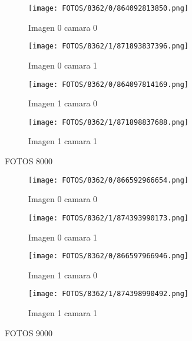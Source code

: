 \documentclass{article}
\begin{document}
\begin{figure}[H]
  \centering
  \begin{minipage}[b]{0.45\textwidth}
    \centering
    \texttt{[image: FOTOS/8362/0/864092813850.png]}
    \caption{Imagen 0 camara 0}
  \end{minipage}
  \begin{minipage}[b]{0.45\textwidth}
    \centering
    \texttt{[image: FOTOS/8362/1/871893837396.png]}
    \caption{Imagen 0 camara 1}
  \end{minipage}
  \begin{minipage}[b]{0.45\textwidth}
    \centering
    \texttt{[image: FOTOS/8362/0/864097814169.png]}
    \caption{Imagen 1 camara 0}
  \end{minipage}
  \begin{minipage}[b]{0.45\textwidth}
    \centering
    \texttt{[image: FOTOS/8362/1/871898837688.png]}
    \caption{Imagen 1 camara 1}
  \end{minipage}
\end{figure}

FOTOS 8000

\begin{figure}[H]
  \centering
  \begin{minipage}[b]{0.45\textwidth}
    \centering
    \texttt{[image: FOTOS/8362/0/866592966654.png]}
    \caption{Imagen 0 camara 0}
  \end{minipage}
  \begin{minipage}[b]{0.45\textwidth}
    \centering
    \texttt{[image: FOTOS/8362/1/874393990173.png]}
    \caption{Imagen 0 camara 1}
  \end{minipage}
  \begin{minipage}[b]{0.45\textwidth}
    \centering
    \texttt{[image: FOTOS/8362/0/866597966946.png]}
    \caption{Imagen 1 camara 0}
  \end{minipage}
  \begin{minipage}[b]{0.45\textwidth}
    \centering
    \texttt{[image: FOTOS/8362/1/874398990492.png]}
    \caption{Imagen 1 camara 1}
  \end{minipage}
\end{figure}

FOTOS 9000
\end{document}
